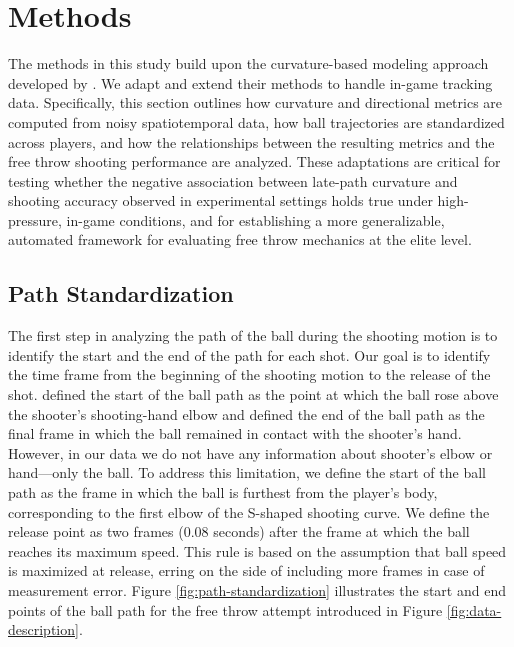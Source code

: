 \documentclass{article}
\begin{document}
  \section{Methods}
  
    The methods in this study build upon the curvature-based modeling approach developed by \citet{slegers_role_2024}. We adapt and extend their methods to handle in-game tracking data. Specifically, this section outlines how curvature and directional metrics are computed from noisy spatiotemporal data, how ball trajectories are standardized across players, and how the relationships between the resulting metrics and the free throw shooting performance are analyzed. These adaptations are critical for testing whether the negative association between late-path curvature and shooting accuracy observed in experimental settings holds true under high-pressure, in-game conditions, and for establishing a more generalizable, automated framework for evaluating free throw mechanics at the elite level.

    \subsection{Path Standardization}

      The first step in analyzing the path of the ball during the shooting motion is to identify the start and the end of the path for each shot. Our goal is to identify the time frame from the beginning of the shooting motion to the release of the shot. \citet{slegers_role_2024} defined the start of the ball path as the point at which the ball rose above the shooter's shooting-hand elbow and defined the end of the ball path as the final frame in which the ball remained in contact with the shooter's hand. However, in our data we do not have any information about shooter's elbow or hand---only the ball. To address this limitation, we define the start of the ball path as the frame in which the ball is furthest from the player's body, corresponding to the first elbow of the S-shaped shooting curve. We define the release point as two frames (0.08 seconds) after the frame at which the ball reaches its maximum speed. This rule is based on the assumption that ball speed is maximized at release, erring on the side of including more frames in case of measurement error. Figure \ref{fig:path-standardization} illustrates the start and end points of the ball path for the free throw attempt introduced in Figure \ref{fig:data-description}.
\end{document}
